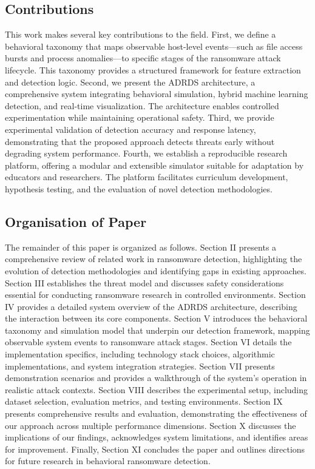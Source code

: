 \subsection{Contributions}

This work makes several key contributions to the field. First, we define a behavioral taxonomy that maps observable host-level events—such as file access bursts and process anomalies—to specific stages of the ransomware attack lifecycle. This taxonomy provides a structured framework for feature extraction and detection logic. Second, we present the ADRDS architecture, a comprehensive system integrating behavioral simulation, hybrid machine learning detection, and real-time visualization. The architecture enables controlled experimentation while maintaining operational safety. Third, we provide experimental validation of detection accuracy and response latency, demonstrating that the proposed approach detects threats early without degrading system performance. Fourth, we establish a reproducible research platform, offering a modular and extensible simulator suitable for adaptation by educators and researchers. The platform facilitates curriculum development, hypothesis testing, and the evaluation of novel detection methodologies.

\subsection{Organisation of Paper}

The remainder of this paper is organized as follows. Section II presents a comprehensive review of related work in ransomware detection, highlighting the evolution of detection methodologies and identifying gaps in existing approaches. Section III establishes the threat model and discusses safety considerations essential for conducting ransomware research in controlled environments. Section IV provides a detailed system overview of the ADRDS architecture, describing the interaction between its core components. Section V introduces the behavioral taxonomy and simulation model that underpin our detection framework, mapping observable system events to ransomware attack stages. Section VI details the implementation specifics, including technology stack choices, algorithmic implementations, and system integration strategies. Section VII presents demonstration scenarios and provides a walkthrough of the system's operation in realistic attack contexts. Section VIII describes the experimental setup, including dataset selection, evaluation metrics, and testing environments. Section IX presents comprehensive results and evaluation, demonstrating the effectiveness of our approach across multiple performance dimensions. Section X discusses the implications of our findings, acknowledges system limitations, and identifies areas for improvement. Finally, Section XI concludes the paper and outlines directions for future research in behavioral ransomware detection.
